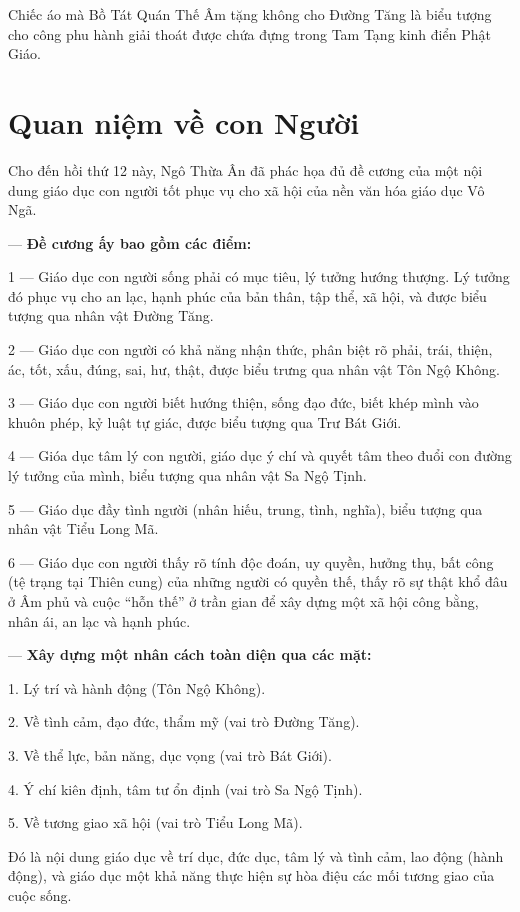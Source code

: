 Chiếc áo mà Bồ Tát Quán Thế Âm tặng không cho Đường Tăng là biểu tượng cho công phu hành giải thoát được chứa đựng trong Tam Tạng kinh điển Phật Giáo.


\section{Quan niệm về con Người} %
\label{sec:9_con_nguoi}

Cho đến hồi thứ 12 này, Ngô Thừa Ân đã phác họa đủ đề cương của một nội dung giáo dục con người tốt phục vụ cho xã hội của nền văn hóa giáo dục Vô Ngã.

— {\bf Đề cương ấy bao gồm các điểm:}

1 — Giáo dục con người sống phải có mục tiêu, lý tưởng hướng thượng. Lý tưởng đó phục vụ cho an lạc, hạnh phúc của bản thân, tập thể, xã hội, và được biểu tượng qua nhân vật Đường Tăng.

2 — Giáo dục con người có khả năng nhận thức, phân biệt rõ phải, trái, thiện, ác, tốt, xấu, đúng, sai, hư, thật, được biểu trưng qua nhân vật Tôn Ngộ Không.

3 — Giáo dục con người biết hướng thiện, sống đạo đức, biết khép mình vào khuôn phép, kỷ luật tự giác, được biểu tượng qua Trư Bát Giới.

4 — Gióa dục tâm lý con người, giáo dục ý chí và quyết tâm theo đuổi con đường lý tưởng của mình, biểu tượng qua nhân vật Sa Ngộ Tịnh.

5 — Giáo dục đầy tình người (nhân hiếu, trung, tình, nghĩa), biểu tượng qua nhân vật Tiểu Long Mã.

6 — Giáo dục con người thấy rõ tính độc đoán, uy quyền, hưởng thụ, bất công (tệ trạng tại Thiên cung) của những người có quyền thế, thấy rõ sự thật khổ đâu ở Âm phủ và cuộc ``hỗn thế'' ở trần gian để xây dựng một xã hội công bằng, nhân ái, an lạc và hạnh phúc.

— {\bf Xây dựng một nhân cách toàn diện qua các mặt:}

1. Lý trí và hành động (Tôn Ngộ Không).

2. Về tình cảm, đạo đức, thẩm mỹ (vai trò Đường Tăng).

3. Về thể lực, bản năng, dục vọng (vai trò Bát Giới).

4. Ý chí kiên định, tâm tư ổn định (vai trò Sa Ngộ Tịnh).

5. Về tương giao xã hội (vai trò Tiểu Long Mã).

Đó là nội dung giáo dục về trí dục, đức dục, tâm lý và tình cảm, lao động (hành động), và giáo dục một khả năng thực hiện sự hòa điệu các mối tương giao của cuộc sống.

